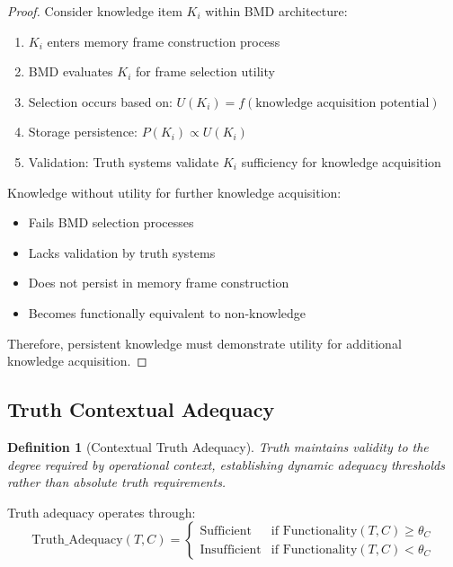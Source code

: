 \documentclass[12pt,a4paper]{article}
\newtheorem{definition}[theorem]{Definition}
\begin{document}
\begin{proof}
Consider knowledge item $K_i$ within BMD architecture:
\begin{enumerate}
\item $K_i$ enters memory frame construction process
\item BMD evaluates $K_i$ for frame selection utility
\item Selection occurs based on: $U(K_i) = f(\text{knowledge acquisition potential})$
\item Storage persistence: $P(K_i) \propto U(K_i)$
\item Validation: Truth systems validate $K_i$ sufficiency for knowledge acquisition
\end{enumerate}

Knowledge without utility for further knowledge acquisition:
\begin{itemize}
\item Fails BMD selection processes
\item Lacks validation by truth systems
\item Does not persist in memory frame construction
\item Becomes functionally equivalent to non-knowledge
\end{itemize}

Therefore, persistent knowledge must demonstrate utility for additional knowledge acquisition.
\end{proof}

\subsection{Truth Contextual Adequacy}

\begin{definition}[Contextual Truth Adequacy]
Truth maintains validity to the degree required by operational context, establishing dynamic adequacy thresholds rather than absolute truth requirements.
\end{definition}

Truth adequacy operates through:
\begin{equation}
\text{Truth\_Adequacy}(T, C) = \begin{cases}
\text{Sufficient} & \text{if } \text{Functionality}(T, C) \geq \theta_C \\
\text{Insufficient} & \text{if } \text{Functionality}(T, C) < \theta_C
\end{cases}
\end{equation}
\end{document}
